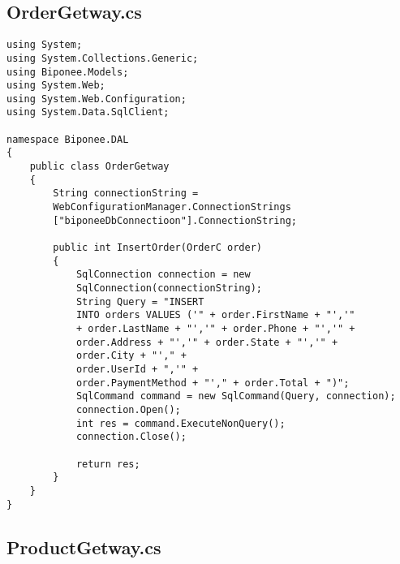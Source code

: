 \newpage

\subsection{OrderGetway.cs}

\begin{lstlisting}
using System;
using System.Collections.Generic;
using Biponee.Models;
using System.Web;
using System.Web.Configuration;
using System.Data.SqlClient;

namespace Biponee.DAL
{
    public class OrderGetway
    {
        String connectionString =
        WebConfigurationManager.ConnectionStrings
        ["biponeeDbConnectioon"].ConnectionString;

        public int InsertOrder(OrderC order)
        {
            SqlConnection connection = new
            SqlConnection(connectionString);
            String Query = "INSERT 
            INTO orders VALUES ('" + order.FirstName + "','" 
            + order.LastName + "','" + order.Phone + "','" + 
            order.Address + "','" + order.State + "','" +
            order.City + "'," + 
            order.UserId + ",'" + 
            order.PaymentMethod + "'," + order.Total + ")";
            SqlCommand command = new SqlCommand(Query, connection);
            connection.Open();
            int res = command.ExecuteNonQuery();
            connection.Close();

            return res;
        }
    }
}
\end{lstlisting}

\newpage

\subsection{ProductGetway.cs}

